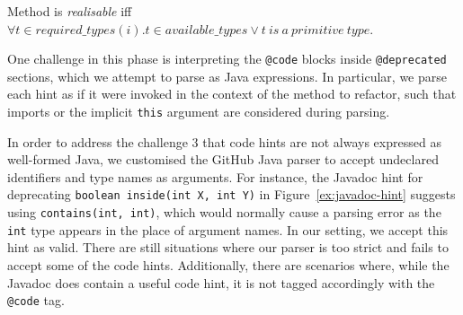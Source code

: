 \documentclass[sigconf,review,anonymous]{acmart}
\begin{document}
\begin{definition}\label{def:realizable}
%
Method  is {\em realisable} iff $\forall t \in
\mathit{required\_types}(i).
t \in \mathit{available\_types} \vee t~is~a~\mathit{primitive}~\mathit{type}$.
%
\end{definition}



One challenge in this phase is interpreting the
\lstinline[breaklines=true]{@code} blocks inside \lstinline[breaklines=true]{@deprecated} sections, which 
we attempt to parse as Java expressions. In particular, we parse each hint as if it were invoked in the context of
the method to refactor, such that imports or the implicit \lstinline[breaklines=true]{this} argument
are considered during parsing.

%
In order to address the challenge 3 that code hints are not always expressed as well-formed Java,
we customised the
GitHub Java parser
to accept undeclared identifiers and type names
as arguments. For instance, the Javadoc hint for deprecating \lstinline[breaklines=true]{boolean inside(int X, int Y)}
in Figure~\ref{ex:javadoc-hint} suggests using
\lstinline[breaklines=true]{contains(int, int)}, which would normally cause a parsing error as the \lstinline[breaklines=true]{int} type
appears in the place of argument names. In our setting, we accept this hint as valid.
There are still situations where our parser is too strict and fails to accept
some of the code hints. Additionally, there are scenarios where, while the Javadoc
does contain a useful code hint, it is not tagged accordingly with
the \lstinline[breaklines=true]{@code} tag. %

 
\end{document}
